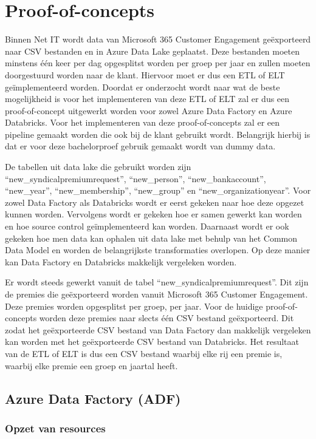 \section{Proof-of-concepts}


Binnen Net IT wordt data van Microsoft 365 Customer Engagement geëxporteerd naar CSV bestanden en in Azure Data Lake geplaatst. Deze bestanden moeten minstens één keer per dag opgesplitst worden per groep per jaar en zullen moeten doorgestuurd worden naar de klant. Hiervoor moet er dus een ETL of ELT geïmplementeerd worden. Doordat er onderzocht wordt naar wat de beste mogelijkheid is voor het implementeren van deze ETL of ELT zal er dus een proof-of-concept uitgewerkt worden voor zowel Azure Data Factory en Azure Databricks. Voor het implementeren van deze proof-of-concepts zal er een pipeline gemaakt worden die ook bij de klant gebruikt wordt. Belangrijk hierbij is dat er voor deze bachelorproef gebruik gemaakt wordt van dummy data.
    

De tabellen uit data lake die gebruikt worden zijn ``new\_syndicalpremiumrequest'', ``new\_person'', ``new\_bankaccount'', ``new\_year'', ``new\_membership'', ``new\_group'' en ``new\_organizationyear''. Voor zowel Data Factory als Databricks wordt er eerst gekeken naar hoe deze opgezet kunnen worden. Vervolgens wordt er gekeken hoe er samen gewerkt kan worden en hoe source control geïmplementeerd kan worden. Daarnaast wordt er ook gekeken hoe men data kan ophalen uit data lake met behulp van het Common Data Model en worden de belangrijkste transformaties overlopen. Op deze manier kan Data Factory en Databricks makkelijk vergeleken worden.
    

Er wordt steeds gewerkt vanuit de tabel ``new\_syndicalpremiumrequest''. Dit zijn de premies die geëxporteerd worden vanuit Microsoft 365 Customer Engagement. Deze premies worden opgesplitst per groep, per jaar. Voor de huidige proof-of-concepts worden deze premies naar slects één CSV bestand geëxporteerd. Dit zodat het geëxporteerde CSV bestand van Data Factory dan makkelijk vergeleken kan worden met het geëxporteerde CSV bestand van Databricks. Het resultaat van de ETL of ELT is dus een CSV bestand waarbij elke rij een premie is, waarbij elke premie een groep en jaartal heeft.

\subsection{Azure Data Factory (ADF)}

\subsubsection{Opzet van resources}


